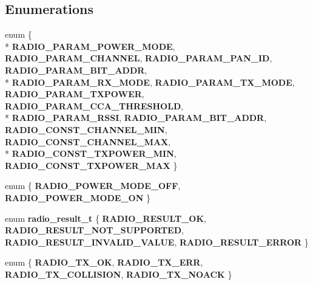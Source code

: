 \subsection*{Enumerations}
\begin{DoxyCompactItemize}
\item 
\hypertarget{group__radio_gadf764cbdea00d65edcd07bb9953ad2b7}{}enum \{ \\*
{\bfseries R\+A\+D\+I\+O\+\_\+\+P\+A\+R\+A\+M\+\_\+\+P\+O\+W\+E\+R\+\_\+\+M\+O\+D\+E}, 
{\bfseries R\+A\+D\+I\+O\+\_\+\+P\+A\+R\+A\+M\+\_\+\+C\+H\+A\+N\+N\+E\+L}, 
{\bfseries R\+A\+D\+I\+O\+\_\+\+P\+A\+R\+A\+M\+\_\+\+P\+A\+N\+\_\+\+I\+D}, 
{\bfseries R\+A\+D\+I\+O\+\_\+\+P\+A\+R\+A\+M\+\_\+B\+I\+T\+\_\+\+A\+D\+D\+R}, 
\\*
{\bfseries R\+A\+D\+I\+O\+\_\+\+P\+A\+R\+A\+M\+\_\+\+R\+X\+\_\+\+M\+O\+D\+E}, 
{\bfseries R\+A\+D\+I\+O\+\_\+\+P\+A\+R\+A\+M\+\_\+\+T\+X\+\_\+\+M\+O\+D\+E}, 
{\bfseries R\+A\+D\+I\+O\+\_\+\+P\+A\+R\+A\+M\+\_\+\+T\+X\+P\+O\+W\+E\+R}, 
{\bfseries R\+A\+D\+I\+O\+\_\+\+P\+A\+R\+A\+M\+\_\+\+C\+C\+A\+\_\+\+T\+H\+R\+E\+S\+H\+O\+L\+D}, 
\\*
{\bfseries R\+A\+D\+I\+O\+\_\+\+P\+A\+R\+A\+M\+\_\+\+R\+S\+S\+I}, 
{\bfseries R\+A\+D\+I\+O\+\_\+\+P\+A\+R\+A\+M\+\_\+B\+I\+T\+\_\+\+A\+D\+D\+R}, 
{\bfseries R\+A\+D\+I\+O\+\_\+\+C\+O\+N\+S\+T\+\_\+\+C\+H\+A\+N\+N\+E\+L\+\_\+\+M\+I\+N}, 
{\bfseries R\+A\+D\+I\+O\+\_\+\+C\+O\+N\+S\+T\+\_\+\+C\+H\+A\+N\+N\+E\+L\+\_\+\+M\+A\+X}, 
\\*
{\bfseries R\+A\+D\+I\+O\+\_\+\+C\+O\+N\+S\+T\+\_\+\+T\+X\+P\+O\+W\+E\+R\+\_\+\+M\+I\+N}, 
{\bfseries R\+A\+D\+I\+O\+\_\+\+C\+O\+N\+S\+T\+\_\+\+T\+X\+P\+O\+W\+E\+R\+\_\+\+M\+A\+X}
 \}\label{group__radio_gadf764cbdea00d65edcd07bb9953ad2b7}

\item 
\hypertarget{group__radio_ga99fb83031ce9923c84392b4e92f956b5}{}enum \{ {\bfseries R\+A\+D\+I\+O\+\_\+\+P\+O\+W\+E\+R\+\_\+\+M\+O\+D\+E\+\_\+\+O\+F\+F}, 
{\bfseries R\+A\+D\+I\+O\+\_\+\+P\+O\+W\+E\+R\+\_\+\+M\+O\+D\+E\+\_\+\+O\+N}
 \}\label{group__radio_ga99fb83031ce9923c84392b4e92f956b5}

\item 
\hypertarget{group__radio_ga3d3ff7a38f834c52d6c2e865857f3031}{}enum {\bfseries radio\+\_\+result\+\_\+t} \{ {\bfseries R\+A\+D\+I\+O\+\_\+\+R\+E\+S\+U\+L\+T\+\_\+\+O\+K}, 
{\bfseries R\+A\+D\+I\+O\+\_\+\+R\+E\+S\+U\+L\+T\+\_\+\+N\+O\+T\+\_\+\+S\+U\+P\+P\+O\+R\+T\+E\+D}, 
{\bfseries R\+A\+D\+I\+O\+\_\+\+R\+E\+S\+U\+L\+T\+\_\+\+I\+N\+V\+A\+L\+I\+D\+\_\+\+V\+A\+L\+U\+E}, 
{\bfseries R\+A\+D\+I\+O\+\_\+\+R\+E\+S\+U\+L\+T\+\_\+\+E\+R\+R\+O\+R}
 \}\label{group__radio_ga3d3ff7a38f834c52d6c2e865857f3031}

\item 
\hypertarget{group__radio_gabc6126af1d45847bc59afa0aa3216b04}{}enum \{ {\bfseries R\+A\+D\+I\+O\+\_\+\+T\+X\+\_\+\+O\+K}, 
{\bfseries R\+A\+D\+I\+O\+\_\+\+T\+X\+\_\+\+E\+R\+R}, 
{\bfseries R\+A\+D\+I\+O\+\_\+\+T\+X\+\_\+\+C\+O\+L\+L\+I\+S\+I\+O\+N}, 
{\bfseries R\+A\+D\+I\+O\+\_\+\+T\+X\+\_\+\+N\+O\+A\+C\+K}
 \}\label{group__radio_gabc6126af1d45847bc59afa0aa3216b04}

\end{DoxyCompactItemize}


